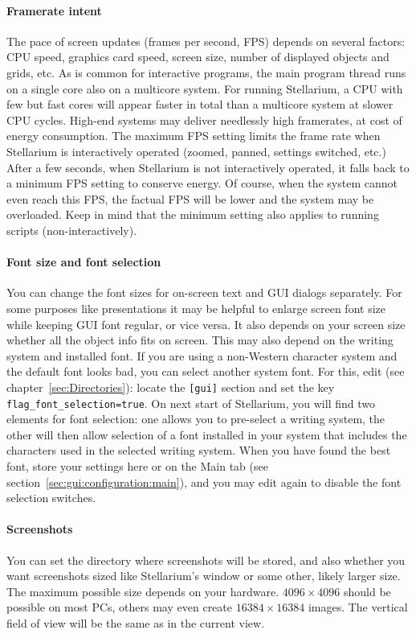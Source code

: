 \paragraph{Framerate intent} \label{sec:gui:configuration:tools:fps} The pace of screen updates (frames per second, FPS) depends on several factors: 
CPU speed, graphics card speed, screen size, number of displayed objects and grids, etc. 
As is common for interactive programs, the main program thread runs on a single core also on a multicore system. 
For running Stellarium, a CPU with few but fast cores will appear faster in total than a multicore system at slower CPU cycles.  
High-end systems may deliver needlessly high framerates, at cost of energy consumption.
The maximum FPS setting limits the frame rate when Stellarium is interactively operated 
(zoomed, panned, settings switched, etc.) 
After a few seconds, when Stellarium is not interactively operated, it falls back to a minimum FPS setting to conserve energy. 
Of course, when the system cannot even reach this FPS, the factual FPS will be lower and the system may be overloaded.
Keep in mind that the minimum setting also applies to running scripts (non-interactively).

\paragraph{Font size and font selection}  You can change the font sizes for on-screen
text and GUI dialogs separately.  For some purposes like presentations
it may be helpful to enlarge screen font size while keeping GUI font
regular, or vice versa.  It also depends on your screen size whether
all the object info fits on screen. This may also depend on the
writing system and installed font. If you are using a non-Western
character system and the default font looks bad, you can select
another system font. For this, edit  (see
chapter~\ref{sec:Directories}): locate the \texttt{[gui]} section and
set the key \texttt{flag\_font\_selection=true}. On next start of
Stellarium, you will find two elements for font selection: one allows
you to pre-select a writing system, the other will then allow
selection of a font installed in your system that includes the
characters used in the selected writing system. When you have found
the best font, store your settings here or on the Main tab (see
section~\ref{sec:gui:configuration:main}), and you may edit
 again to disable the font selection switches.

\paragraph{Screenshots} You can set the directory where screenshots
will be stored, and  also whether you want
screenshots sized like Stellarium's window or some other, likely
larger size. The maximum possible size depends on your
hardware. $4096\times4096$ should be possible on most PCs, others may
even create $16384\times16384$ images. The vertical field of view will be the same as in the current view.

